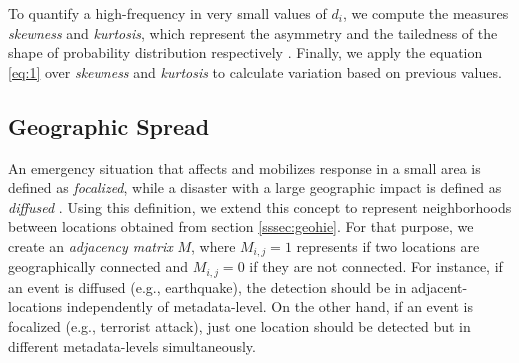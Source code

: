 \documentclass[sigconf]{acmart}
\begin{document}
To quantify a high-frequency in very small values of $d_{i}$, we compute the measures \textit{skewness} and \textit{kurtosis}, which represent the asymmetry and the tailedness of the shape of probability distribution respectively \cite{mardia1970measures}. Finally, we apply the equation \ref{eq:1} over \textit{skewness} and \textit{kurtosis} to calculate variation based on previous values.


\subsection{Geographic Spread}\label{sssec:geospread}

An emergency situation that affects and mobilizes response in a small area is defined as \textit{focalized}, while a disaster with a large geographic impact is defined as \textit{diffused} \cite{olteanu2015expect}. Using this definition, we extend this concept to represent neighborhoods between locations obtained from section \ref{sssec:geohie}. For that purpose, we create an \textit{adjacency matrix} $M$, where $M_{i,j} = 1$ represents if two locations are geographically connected and $M_{i,j} = 0$ if they are not connected. For instance, if an event is diffused (e.g., earthquake), the detection should be in adjacent-locations independently of metadata-level. On the other hand, if an event is focalized (e.g., terrorist attack), just one location should be detected but in different metadata-levels simultaneously.
\end{document}
